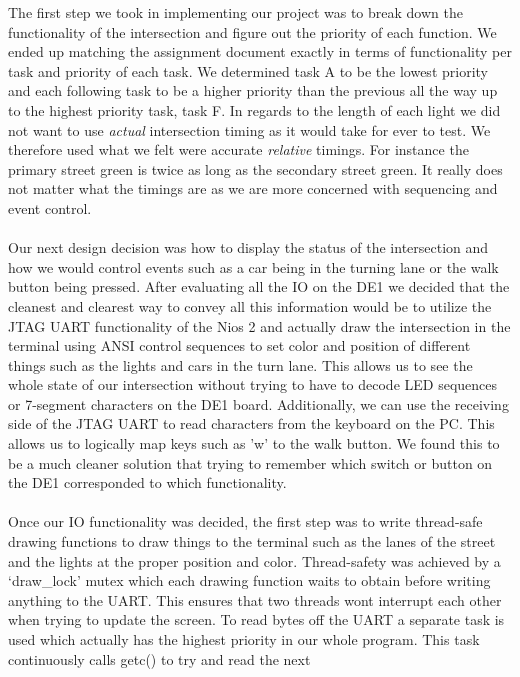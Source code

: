 \documentclass[10pt]{article}
\begin{document}
The first step we took in implementing our project was to break down the
functionality of the intersection and figure out the priority of each function.
We ended up matching the assignment document exactly in terms of functionality
per task and priority of each task. We determined task A to be the lowest
priority and each following task to be a higher priority than the previous all
the way up to the highest priority task, task F. In regards to the length of
each light we did not want to use \emph{actual} intersection timing as it would
take for ever to test. We therefore used what we felt were accurate
\emph{relative} timings. For instance the primary street green is twice as long
as the secondary street green. It really does not matter what the timings are
as we are more concerned with sequencing and event control. 
\\\\
Our next design decision was how to display the status of the intersection and
how we would control events such as a car being in the turning lane or the walk
button being pressed. After evaluating all the IO on the DE1 we decided that
the cleanest and clearest way to convey all this information would be to
utilize the JTAG UART functionality of the Nios 2 and actually draw the
intersection in the terminal using ANSI control sequences to set color and
position of different things such as the lights and cars in the turn lane. This
allows us to see the whole state of our intersection without trying to have to
decode LED sequences or 7-segment characters on the DE1 board. Additionally, we
can use the receiving side of the JTAG UART to read characters from the
keyboard on the PC.  This allows us to logically map keys such as 'w' to the
walk button. We found this to be a much cleaner solution that trying to
remember which switch or button on the DE1 corresponded to which functionality.
\\\\ 
Once our IO functionality was decided, the first step was to write
thread-safe drawing functions to draw things to the terminal such as the lanes
of the street and the lights at the proper position and color. Thread-safety
was achieved by a `draw\_lock' mutex which each drawing function waits to
obtain before writing anything to the UART. This ensures that two threads wont
interrupt each other when trying to update the screen. To read bytes off the
UART a separate task is used which actually has the highest priority in our
whole program. This task continuously calls getc() to try and read the next
\end{document}
